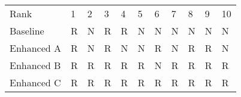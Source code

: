 \begin{tabular}{lllllllllll}
Rank & 1 & 2 & 3 & 4 & 5 & 6 & 7 & 8 & 9 & 10 \\
Baseline & R & N & R & R & N & N & N & N & N & N \\
Enhanced A & R & N & R & N & N & R & N & R & R & N \\
Enhanced B & R & R & R & R & R & N & R & R & R & R \\
Enhanced C & R & R & R & R & R & R & R & R & R & R \\
\end{tabular}
